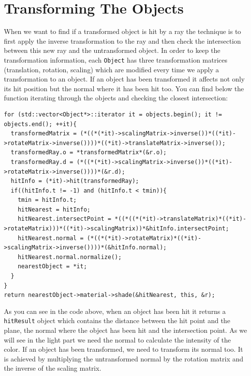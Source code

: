 \documentclass[a4paper,11.5pt]{article}
\theoremstyle{mytheor}
\begin{document}
\section{Transforming The Objects}
When we want to find if a transformed object is hit by a ray the technique is to first apply the inverse transformation to the ray and then check the intersection between this new ray and the untransformed object. In order to keep the transformation information, each \texttt{Object} has three transformation matrices (translation, rotation, scaling) which are modified every time we apply a transformation to an object. If an object has been transformed it affects not only its hit position but the normal where it has been hit too. You can find below the function iterating through the objects and checking the closest intersection:
\begin{lstlisting}
for (std::vector<Object*>::iterator it = objects.begin(); it != objects.end(); ++it){
  transformedMatrix = (*((*(*it)->scalingMatrix->inverse())*((*it)->rotateMatrix->inverse())))*((*it)->translateMatrix->inverse());
  transformedRay.o = *transformedMatrix*(&r.o);
  transformedRay.d = (*((*(*it)->scalingMatrix->inverse())*((*it)->rotateMatrix->inverse())))*(&r.d);
  hitInfo = (*it)->hit(transformedRay);
  if((hitInfo.t != -1) and (hitInfo.t < tmin)){
    tmin = hitInfo.t;
    hitNearest = hitInfo;
    hitNearest.intersectPoint = *((*((*(*it)->translateMatrix)*((*it)->rotateMatrix)))*((*it)->scalingMatrix))*&hitInfo.intersectPoint;
    hitNearest.normal = (*((*(*it)->rotateMatrix)*((*it)->scalingMatrix->inverse())))*(&hitInfo.normal);
    hitNearest.normal.normalize();
    nearestObject = *it;
  }
}
return nearestObject->material->shade(&hitNearest, this, &r);
\end{lstlisting}
As you can see in the code above, when an object has been hit it returns a \texttt{hitResult} object which contains the distance between the hit point and the plane, the normal where the object has been hit and the intersection point. As we will see in the light part we need the normal to calculate the intensity of the color. If an object has been transformed, we need to transform its normal too. It is achieved by multiplying the untransformed normal by the rotation matrix and the inverse of the scaling matrix. 
\begin{figure}[H]
\centering
{}
\end{figure} 
\end{document}
